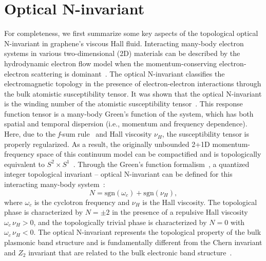 \documentclass[%
reprint,
amsmath,amssymb,
aps,superscriptaddress
]{revtex4-2}
\begin{document}
\section{Optical N-invariant}\label{Ninvariant}

For completeness, we first summarize some key aspects of the topological optical N-invariant in graphene's viscous Hall fluid. Interacting many-body electron systems in various two-dimensional (2D) materials can be described by the hydrodynamic electron flow model when the momentum-conserving electron-electron scattering is dominant~\cite{jenkins2022imaging,sulpizio2019visualizing,berdyugin2019measuring,lucas2018hydrodynamics,bandurin2016negative,pusep2022diffusion,moll2016evidence,gooth2018thermal,pellegrino2017nonlocal}. The optical N-invariant classifies the electromagnetic topology in the presence of electron-electron interactions through the bulk atomistic susceptibility tensor. It was shown that the optical N-invariant is the winding number of the atomistic susceptibility tensor~\cite{van2022optical}.  This response function tensor is a many-body Green's function of the system, which has both spatial and temporal dispersion (i.e., momentum and frequency dependence). Here, due to the \emph{f}-sum rule~\cite{gusynin2007sum} and Hall viscosity $\nu_H$, the susceptibility tensor is properly regularized. As a result, the originally unbounded 2+1D momentum-frequency space of this continuum model can be compactified and is topologically equivalent to $S^2\times S^1$~\cite{van2021optical,souslov2019topological}. Through the Green's function formalism~\cite{volovik2003universe,gurarie2011single}, a quantized integer topological invariant -- optical N-invariant can be defined for this interacting many-body system~\cite{van2021optical}:
\begin{equation}
    N=\mathrm{sgn}(\omega_c)+\mathrm{sgn}(\nu_H),
\end{equation}
where $\omega_c$ is the cyclotron frequency and $\nu_H$ is the Hall viscosity. The topological phase is characterized by $N=\pm 2$ in the presence of a repulsive Hall viscosity $\omega_c \, \nu_H >0$, and the topologically trivial phase is characterized by $N=0$ with $\omega_c \, \nu_H < 0$. The optical N-invariant represents the topological property of the bulk plasmonic band structure and is fundamentally different from the Chern invariant and $Z_2$ invariant that are related to the bulk electronic band structure~\cite{haldane1988model,kane2005quantum}. 
\end{document}
